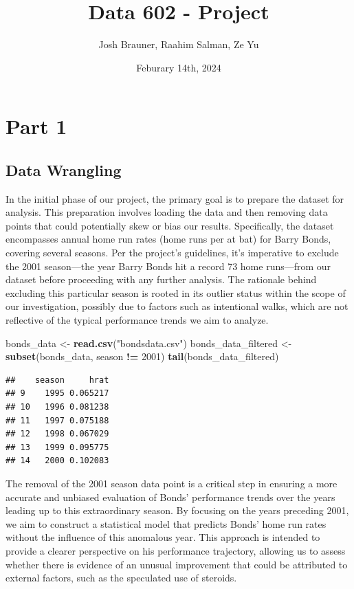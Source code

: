 \documentclass[
]{article}
\title{Data 602 - Project}
\author{Josh Brauner, Raahim Salman, Ze Yu}
\date{Feburary 14th, 2024}
\newenvironment{Shaded}{\begin{snugshade}}{\end{snugshade}}
\newcommand{\DecValTok}[1]{\textcolor[rgb]{0.00,0.00,0.81}{#1}}
\newcommand{\FunctionTok}[1]{\textcolor[rgb]{0.13,0.29,0.53}{\textbf{#1}}}
\newcommand{\NormalTok}[1]{#1}
\newcommand{\OtherTok}[1]{\textcolor[rgb]{0.56,0.35,0.01}{#1}}
\newcommand{\SpecialCharTok}[1]{\textcolor[rgb]{0.81,0.36,0.00}{\textbf{#1}}}
\newcommand{\StringTok}[1]{\textcolor[rgb]{0.31,0.60,0.02}{#1}}
\begin{document}
\maketitle

\hypertarget{part-1}{%
\section{Part 1}\label{part-1}}

\hypertarget{data-wrangling}{%
\subsection{Data Wrangling}\label{data-wrangling}}

In the initial phase of our project, the primary goal is to prepare the
dataset for analysis. This preparation involves loading the data and
then removing data points that could potentially skew or bias our
results. Specifically, the dataset encompasses annual home run rates
(home runs per at bat) for Barry Bonds, covering several seasons. Per
the project's guidelines, it's imperative to exclude the 2001
season---the year Barry Bonds hit a record 73 home runs---from our
dataset before proceeding with any further analysis. The rationale
behind excluding this particular season is rooted in its outlier status
within the scope of our investigation, possibly due to factors such as
intentional walks, which are not reflective of the typical performance
trends we aim to analyze.

\begin{Shaded}
\begin{Highlighting}[]
\NormalTok{bonds\_data }\OtherTok{\textless{}{-}} \FunctionTok{read.csv}\NormalTok{(}\StringTok{"bondsdata.csv"}\NormalTok{)}
\NormalTok{bonds\_data\_filtered }\OtherTok{\textless{}{-}} \FunctionTok{subset}\NormalTok{(bonds\_data, season }\SpecialCharTok{!=} \DecValTok{2001}\NormalTok{)}
\FunctionTok{tail}\NormalTok{(bonds\_data\_filtered)}
\end{Highlighting}
\end{Shaded}

\begin{verbatim}
##    season     hrat
## 9    1995 0.065217
## 10   1996 0.081238
## 11   1997 0.075188
## 12   1998 0.067029
## 13   1999 0.095775
## 14   2000 0.102083
\end{verbatim}

The removal of the 2001 season data point is a critical step in ensuring
a more accurate and unbiased evaluation of Bonds' performance trends
over the years leading up to this extraordinary season. By focusing on
the years preceding 2001, we aim to construct a statistical model that
predicts Bonds' home run rates without the influence of this anomalous
year. This approach is intended to provide a clearer perspective on his
performance trajectory, allowing us to assess whether there is evidence
of an unusual improvement that could be attributed to external factors,
such as the speculated use of steroids.
\end{document}
